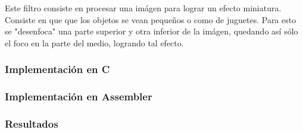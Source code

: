 Este filtro consiste en procesar una im\'agen para lograr un efecto miniatura. Consiste en que que los objetos se vean pequeños o como de juguetes. Para esto se "desenfoca" una parte superior y otra inferior de la im\'agen, quedando as\'i s\'olo el foco en la parte del medio, logrando tal efecto.


\subsubsection{Implementación en C}


\subsubsection{Implementación en Assembler}


\subsubsection{Resultados}
